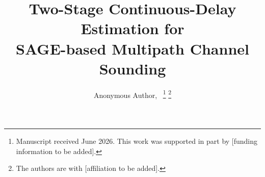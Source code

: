 \documentclass[journal]{IEEEtran}
\begin{document}
\title{Two-Stage Continuous-Delay Estimation for\\SAGE-based Multipath Channel Sounding}

\author{Anonymous Author,~
\thanks{Manuscript received June 2026. This work was supported in part by [funding information to be added].}
\thanks{The authors are with [affiliation to be added].}}

\maketitle

\end{document}
